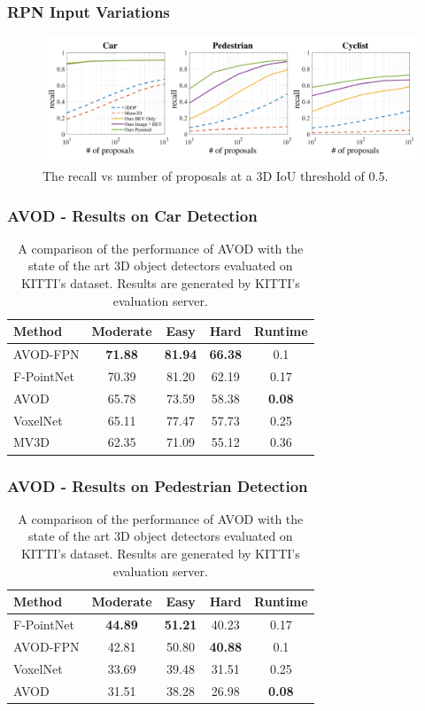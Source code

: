 \documentclass[10pt,fleqn,unknownkeysallowed]{beamer}
\begin{document}
\begin{frame}
	\frametitle{RPN Input Variations}
	\begin{figure}
		\hspace{-1.16cm} 
			\includegraphics[width=1.08\textwidth]{images/pdfs/RPN_Results.pdf}
			\caption{The recall vs number of proposals at a 3D IoU threshold of 0.5.}
	\end{figure}
\end{frame}

\begin{frame}
	\frametitle{AVOD - Results on Car Detection}
\begin{table}
	\begin{tabular}{l | c | c | c | c }
		Method & Moderate & Easy & Hard & Runtime \\
		\hline \hline
		AVOD-FPN & \textbf{71.88} & \textbf{81.94} & \textbf{66.38} & 0.1 \\
		F-PointNet & 70.39 & 81.20 & 62.19  & 0.17 \\ 
		AVOD & 65.78 & 73.59 & 58.38 & \textbf{0.08} \\
		VoxelNet & 65.11 & 77.47 & 57.73 & 0.25 \\
		MV3D & 62.35 & 71.09 & 55.12 & 0.36 \\
	\end{tabular}
	\caption{A comparison of the performance of AVOD with the state of the art 3D object detectors evaluated on KITTI's dataset. Results are generated by KITTI's evaluation server.}
\end{table}
\end{frame}

\begin{frame}
	\frametitle{AVOD - Results on Pedestrian Detection}
	\begin{table}
		\begin{tabular}{l | c | c | c | c }
			Method & Moderate & Easy & Hard & Runtime \\
			\hline \hline
			F-PointNet & \textbf{44.89} & \textbf{51.21} & 40.23 & 0.17 \\
			AVOD-FPN & 42.81 & 50.80 & \textbf{40.88} & 0.1 \\
			VoxelNet & 33.69 & 39.48 & 31.51	 & 0.25 \\ 
			AVOD & 31.51 & 38.28 & 26.98 & \textbf{0.08} \\
		\end{tabular}
		\caption{A comparison of the performance of AVOD with the state of the art 3D object detectors evaluated on KITTI's dataset. Results are generated by KITTI's evaluation server.}
	\end{table}
\end{frame}
\end{document}
